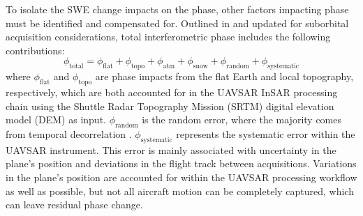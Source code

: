 To isolate the SWE change impacts on the phase, other factors impacting phase must be identified and compensated for. Outlined in \citet{deebMonitoringSnowpackEvolution2011} and updated for suborbital acquisition considerations, total interferometric phase includes the following contributions:
\begin{equation}
\phi_\mathrm{total} =  \phi_\mathrm{flat} + \phi_\mathrm{topo} + \phi_\mathrm{atm} + \phi_{\mathrm{snow}} + \phi_\mathrm{random} +\phi_\mathrm{systematic}
\end{equation}
where $\phi_\mathrm{flat}$ and $\phi_\mathrm{topo}$ are phase impacts from the flat Earth and local topography, respectively, which are both accounted for in the UAVSAR InSAR processing chain using the Shuttle Radar Topography Mission (SRTM) digital elevation model (DEM) as input. $\phi_\mathrm{random}$ is the random error, where the majority comes from temporal decorrelation \citep{zebkerAtmosphericEffectsInterferometric1997}. $\phi_\mathrm{systematic}$ represents the systematic error within the UAVSAR instrument. This error is mainly associated with uncertainty in the plane's position and deviations in the flight track between acquisitions. Variations in the plane's position are accounted for within the UAVSAR processing workflow as well as possible, but not all aircraft motion can be completely captured, which can leave residual phase change.

